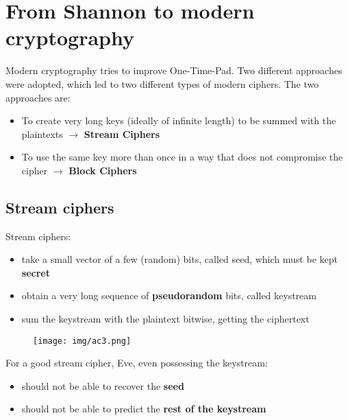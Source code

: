 \documentclass[a4paper, 10pt, titlepage]{article}
\begin{document}
\newpage
\section{From Shannon to modern cryptography}
Modern cryptography tries to improve One-Time-Pad.
Two different approaches were adopted, which led to two different types of modern ciphers. The two approaches are:
\begin{itemize}
\item To create very long keys (ideally of infinite length) to be summed with the plaintexts $\rightarrow$ \textbf{Stream Ciphers}
\item To use the same key more than once in a way that does not
compromise the cipher $\rightarrow$ \textbf{Block Ciphers}
\end{itemize}

\subsection{Stream ciphers}
Stream ciphers:
\begin{itemize}
\item take a small vector of a few (random) bits, called seed, which must be kept \textbf{secret}
\item obtain a very long sequence of \textbf{pseudorandom} bits, called keystream
\item sum the keystream with the plaintext bitwise, getting the ciphertext
\end{itemize}
\begin{figure}[h]
\centering
\texttt{[image: img/ac3.png]}
\end{figure}
For a good stream cipher, Eve, even possessing the keystream:
\begin{itemize}
\item should not be able to recover the \textbf{seed}
\item should not be able to predict the \textbf{rest of the keystream}
\end{itemize}
\end{document}
